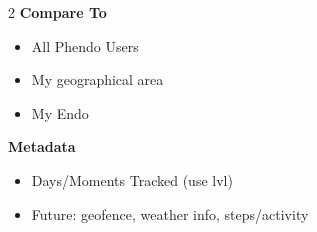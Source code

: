 \begin{multicols}{2}
  \textbf{Compare To}
  \begin{itemize}
    \item All Phendo Users
    \item My geographical area
    \item My Endo
  \end{itemize}

  \textbf{Metadata}
  \begin{itemize}
    \item Days/Moments Tracked (use lvl)
    \item Future: geofence, weather info, steps/activity
  \end{itemize}

\end{multicols}
